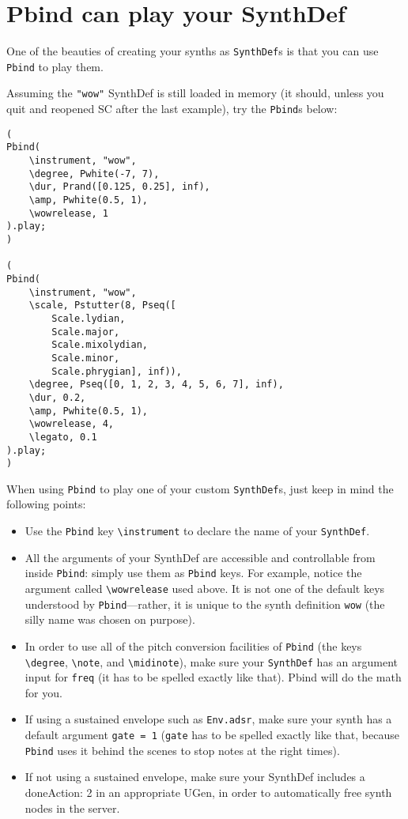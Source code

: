 \section{Pbind can play your SynthDef}

One of the beauties of creating your synths as \texttt{SynthDef}s is that you can use \texttt{Pbind} to play them.

Assuming the \texttt{"wow"} SynthDef is still loaded in memory (it should, unless you quit and reopened SC after the last example), try the \texttt{Pbind}s below:

\begin{lstlisting}[style=SuperCollider-IDE, basicstyle=\scttfamily\footnotesize]
(
Pbind(
	\instrument, "wow",
	\degree, Pwhite(-7, 7),
	\dur, Prand([0.125, 0.25], inf),
	\amp, Pwhite(0.5, 1),
	\wowrelease, 1
).play;
)

(
Pbind(
	\instrument, "wow",
	\scale, Pstutter(8, Pseq([
		Scale.lydian,
		Scale.major,
		Scale.mixolydian,
		Scale.minor,
		Scale.phrygian], inf)),
	\degree, Pseq([0, 1, 2, 3, 4, 5, 6, 7], inf),
	\dur, 0.2,
	\amp, Pwhite(0.5, 1),
	\wowrelease, 4,
	\legato, 0.1
).play;
)
\end{lstlisting}
 

When using \texttt{Pbind} to play one of your custom \texttt{SynthDef}s, just keep in mind the following points:

\begin{itemize}
\item Use the \texttt{Pbind} key \texttt{\textbackslash instrument} to declare the name of your \texttt{SynthDef}.

\item All the arguments of your SynthDef are accessible and controllable from inside \texttt{Pbind}: simply use them as \texttt{Pbind} keys. For example, notice the argument called \texttt{\textbackslash wowrelease} used above. It is not one of the default keys understood by \texttt{Pbind}---rather, it is unique to the synth definition \texttt{wow} (the silly name was chosen on purpose).

\item In order to use all of the pitch conversion facilities of \texttt{Pbind} (the keys \texttt{\textbackslash degree}, \texttt{\textbackslash note}, and \texttt{\textbackslash midinote}), make sure your \texttt{SynthDef} has an argument input for \texttt{freq} (it has to be spelled exactly like that). Pbind will do the math for you.

\item If using a sustained envelope such as \texttt{Env.adsr}, make sure your synth has a default argument \texttt{gate = 1} (\texttt{gate} has to be spelled exactly like that, because \texttt{Pbind} uses it behind the scenes to stop notes at the right times).

\item If not using a sustained envelope, make sure your SynthDef includes a doneAction: 2 in an appropriate UGen, in order to automatically free synth nodes in the server.

\end{itemize}

